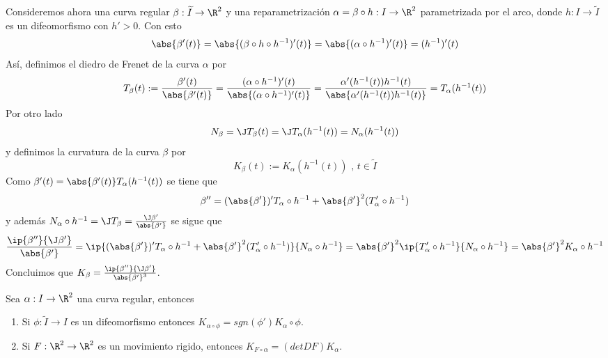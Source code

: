 \documentclass{article}
\begin{document}
\noindent Consideremos ahora una curva regular $\beta:\widetilde{I}\to\R^{2}$ y una 
reparametrización $\alpha=\beta\circ h: I\to\R^{2}$ parametrizada por el arco, donde 
$h: I\to\widetilde{I}$ es un difeomorfismo con $h'>0$. Con esto
\begin{equation*}
    \abs{\beta'(t)}=\abs{(\beta\circ h\circ h^{-1})'(t)}=\abs{(\alpha\circ h^{-1})'(t)}=
    (h^{-1})'(t)
\end{equation*}
Así, definimos el diedro de Frenet de la curva $\alpha$ por
\begin{equation*}
    T_{\beta}(t):=\frac{\beta'(t)}{\abs{\beta'(t)}}=
    \frac{(\alpha\circ h^{-1})'(t)}{\abs{(\alpha\circ h^{-1})'(t)}}=
    \frac{\alpha'(h^{-1}(t))h^{-1}(t)}{\abs{\alpha'(h^{-1}(t))h^{-1}(t)}}=
    T_{\alpha}(h^{-1}(t))
\end{equation*}
Por otro lado
\begin{equation*}
    N_{\beta}=\J T_{\beta}(t)=\J T_{\alpha}(h^{-1}(t))=N_{\alpha}(h^{-1}(t))
\end{equation*}
y definimos la curvatura de la curva $\beta$ por
\begin{equation*}
    K_{\beta}(t):=K_{\alpha}(h^{-1}(t))\text{ , }t\in\widetilde{I}
\end{equation*}
Como $\beta'(t)=\abs{\beta'(t)}T_{\alpha}(h^{-1}(t))$ se tiene que
\begin{equation*}
    \beta''=(\abs{\beta'})'T_{\alpha}\circ h^{-1}+\abs{\beta'}^{2}(T'_{\alpha}\circ h^{-1})
\end{equation*}
y además $N_{\alpha}\circ h^{-1}=\J T_{\beta}=\frac{\J\beta'}{\abs{\beta'}}$ se sigue que
\begin{equation*}
    \frac{\ip{\beta''}{\J\beta'}}{\abs{\beta'}}=
    \ip{(\abs{\beta'})'T_{\alpha}\circ h^{-1}+\abs{\beta'}^{2}(T'_{\alpha}\circ h^{-1})}
    {N_{\alpha}\circ h^{-1}}=\abs{\beta'}^{2}\ip{T'_{\alpha}\circ h^{-1}}{N_{\alpha}\circ h^{-1}}
    =\abs{\beta'}^{2}K_{\alpha}\circ h^{-1}
\end{equation*}
Concluimos que $K_{\beta}=\frac{\ip{\beta''}{\J\beta'}}{\abs{\beta'}^{3}}$.

\begin{prop}
    Sea $\alpha: I\to\R^{2}$ una curva regular, entonces
    \begin{enumerate}
        \item Si $\phi:\widetilde{I}\to I$ es un difeomorfismo entonces $K_{\alpha\circ\phi}=
        sgn(\phi')K_{\alpha}\circ\phi$.
        
        \item Si $F:\R^{2}\to\R^{2}$ es un movimiento rigido, entonces $K_{F\circ\alpha}=
        (detDF)K_{\alpha}$.
    \end{enumerate}
\end{prop}
\end{document}

